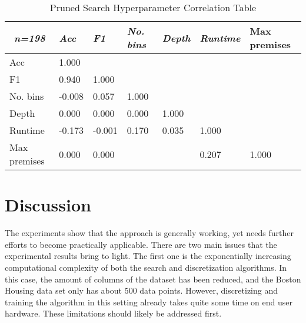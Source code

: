 \begin{table}[h]
\centering
\begin{tabular}{lllllll}
\multicolumn{1}{c}{\textit{n=198}} & \textit{Acc} & \textit{F1} & \textit{No. bins} & \textit{Depth} & \textit{Runtime} & Max premises                                    \\ \hline
Acc                                                                               & 1.000        &             &                   &                &                  &                                                 \\
F1                                                                                & 0.940        & 1.000       &                   &                &                  &                                                 \\
No. bins                                                                          & -0.008       & 0.057       & 1.000             &                &                  &                                                 \\
Depth                                                                             & 0.000        & 0.000       & 0.000             & 1.000          &                  &                                                 \\
Runtime                                                                           & -0.173       & -0.001      & 0.170             & 0.035          & 1.000            &                                                  \\
Max premises                                                                      & 0.000        & 0.000       &                   &                & 0.207            & 1.000                                           \\ \hline
\end{tabular}
\caption{Pruned Search Hyperparameter Correlation Table}
\label{tab:pruned search}
\end{table}

\section{Discussion}

The experiments show that the approach is generally working, yet needs further efforts to become practically applicable. There are two main issues that the experimental results bring to light. The first one is the exponentially increasing computational complexity of both the search and discretization algorithms. In this case, the amount of columns of the dataset has been reduced, and the Boston Housing data set only has about 500 data points. However, discretizing and training the algorithm in this setting already takes quite some time on end user hardware. These limitations should likely be  addressed first.

